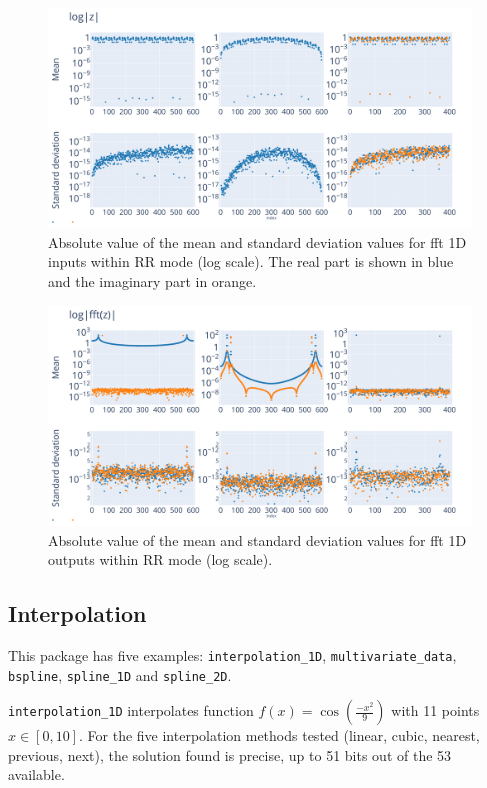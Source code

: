 \documentclass[10pt,journal,compsoc]{IEEEtran}
\begin{document}
\begin{figure}
    \centering
    \includegraphics[width=\linewidth]{figure/FFT/fft_x.pdf}
    \caption{Absolute value of the mean and standard deviation values for
        fft 1D inputs within RR mode (log scale). The real part is shown in blue and the imaginary part in orange.}
    \label{fig:fft1D_inputs}
\end{figure}

\begin{figure}
    \centering
    \includegraphics[width=\linewidth]{figure/FFT/fft_y.pdf}
    \caption{Absolute value of the mean and standard deviation values
        for fft 1D outputs within RR mode (log scale).}
    \label{fig:fft1D_outputs}
\end{figure}


\subsection{Interpolation}

This package has five examples: \texttt{interpolation\_1D},
\texttt{multivariate\_data}, \texttt{bspline}, \texttt{spline\_1D} and
\texttt{spline\_2D}.

\texttt{interpolation\_1D} interpolates function $f(x)=\cos(\frac{-x^2}{9})$
with 11 points $x\in[0,10]$. For the five interpolation methods tested (linear,
cubic, nearest, previous, next), the solution found is precise, up to 51 bits
out of the 53 available.
\end{document}
